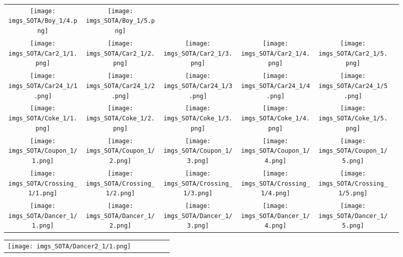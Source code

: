 \begin{figure}[H]
\begin{tabular}{@{}c@{}c@{}c@{}c@{}c@{}c@{}}
\texttt{[image: imgs\_SOTA/Boy\_1/4.png]}&
\texttt{[image: imgs\_SOTA/Boy\_1/5.png]}&
\\
\texttt{[image: imgs\_SOTA/Car2\_1/1.png]}&
\texttt{[image: imgs\_SOTA/Car2\_1/2.png]}&
\texttt{[image: imgs\_SOTA/Car2\_1/3.png]}&
\texttt{[image: imgs\_SOTA/Car2\_1/4.png]}&
\texttt{[image: imgs\_SOTA/Car2\_1/5.png]}&
\\
\texttt{[image: imgs\_SOTA/Car24\_1/1.png]}&
\texttt{[image: imgs\_SOTA/Car24\_1/2.png]}&
\texttt{[image: imgs\_SOTA/Car24\_1/3.png]}&
\texttt{[image: imgs\_SOTA/Car24\_1/4.png]}&
\texttt{[image: imgs\_SOTA/Car24\_1/5.png]}&
\\
\texttt{[image: imgs\_SOTA/Coke\_1/1.png]}&
\texttt{[image: imgs\_SOTA/Coke\_1/2.png]}&
\texttt{[image: imgs\_SOTA/Coke\_1/3.png]}&
\texttt{[image: imgs\_SOTA/Coke\_1/4.png]}&
\texttt{[image: imgs\_SOTA/Coke\_1/5.png]}&
\\
\texttt{[image: imgs\_SOTA/Coupon\_1/1.png]}&
\texttt{[image: imgs\_SOTA/Coupon\_1/2.png]}&
\texttt{[image: imgs\_SOTA/Coupon\_1/3.png]}&
\texttt{[image: imgs\_SOTA/Coupon\_1/4.png]}&
\texttt{[image: imgs\_SOTA/Coupon\_1/5.png]}&
\\
\texttt{[image: imgs\_SOTA/Crossing\_1/1.png]}&
\texttt{[image: imgs\_SOTA/Crossing\_1/2.png]}&
\texttt{[image: imgs\_SOTA/Crossing\_1/3.png]}&
\texttt{[image: imgs\_SOTA/Crossing\_1/4.png]}&
\texttt{[image: imgs\_SOTA/Crossing\_1/5.png]}&
\\
\texttt{[image: imgs\_SOTA/Dancer\_1/1.png]}&
\texttt{[image: imgs\_SOTA/Dancer\_1/2.png]}&
\texttt{[image: imgs\_SOTA/Dancer\_1/3.png]}&
\texttt{[image: imgs\_SOTA/Dancer\_1/4.png]}&
\texttt{[image: imgs\_SOTA/Dancer\_1/5.png]}&
\\
\end{tabular}\end{figure}\begin{figure}[H]
\setlength{\tabcolsep}{6pt}
\renewcommand{\arraystretch}{0}
\begin{tabular}{@{}c@{}c@{}c@{}c@{}c@{}c@{}}\texttt{[image: imgs\_SOTA/Dancer2\_1/1.png]}&

\end{tabular}
\end{figure}
